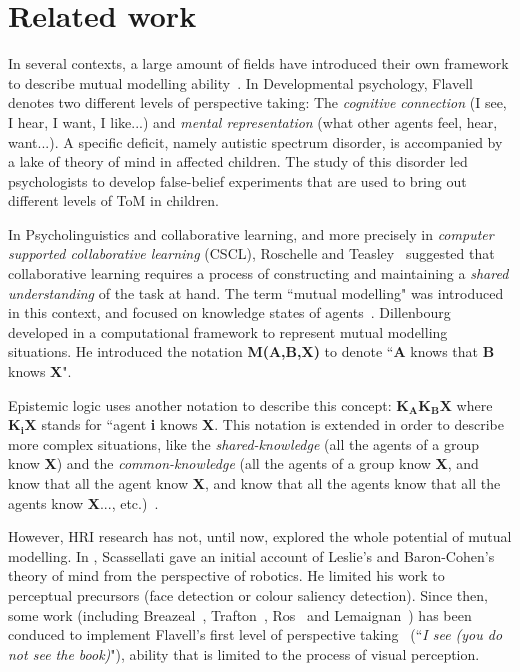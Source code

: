 \documentclass[10pt,a4paper]{article}
\begin{document}
\section{Related work}\label{rw}


In several contexts, a large amount of fields have introduced their own framework to describe mutual modelling ability~\cite{lemaignan2015mutual}. 
In Developmental psychology, Flavell~\cite{flavell1990developmental} denotes two different levels of perspective taking: The \textit{cognitive connection} (I see, I hear, I want, I like...) and \textit{mental representation} (what other agents feel, hear, want...). A specific deficit, namely autistic spectrum disorder, is accompanied by a lake of theory of mind in affected children. The study of this disorder led psychologists to develop false-belief experiments\cite{baron1985does}\cite{frith1994autism} that are used to bring out different levels of ToM in children.

In Psycholinguistics and collaborative learning, and more precisely in \textit{computer supported collaborative learning} (CSCL), Roschelle and Teasley~\cite{roschelle1995construction} suggested that collaborative learning requires a process of constructing and maintaining a \textit{shared understanding} of the task at hand. 
The term ``mutual modelling" was introduced in this context, and focused on knowledge states of agents~\cite{dillenbourg1999you}. Dillenbourg developed in \cite{sangin2007partner} a computational framework to represent mutual modelling situations. He introduced the notation \textbf{M(A,B,X)} to denote ``\textbf{A} knows that \textbf{B} knows \textbf{X}".

Epistemic logic uses another notation to describe this concept: $\textbf{K}_{\textbf{A}}\textbf{K}_{\textbf{B}}\textbf{X}$ where $\textbf{K}_{\textbf{i}}\textbf{X}$ stands for ``agent \textbf{i} knows \textbf{X}. This notation is extended in order to describe more complex situations, like the \textit{shared-knowledge} (all the agents of a group know \textbf{X}) and the \textit{common-knowledge} (all the agents of a group know \textbf{X}, and know that all the agent know \textbf{X}, and know that all the agents know that all the agents know \textbf{X}..., etc.)~\cite{hendricks2008epistemic}. 

However, HRI research has not, until now, explored the whole potential of mutual modelling. In \cite{scassellati2002theory}, Scassellati gave an initial account of Leslie's and Baron-Cohen's theory of mind from the perspective of robotics. He limited his work to perceptual precursors (face detection or colour saliency detection). Since then, some work (including Breazeal~\cite{breazeal2006using}, Trafton~\cite{Trafton2005}, Ros~\cite{Ros2010} and Lemaignan~\cite{lemaignan2012thesis}) has been conduced to implement Flavell's first level of perspective taking~\cite{flavell1977development} (``\textit{I see (you do not see the book)}"), ability that is limited to the process of visual perception. 
\end{document}
